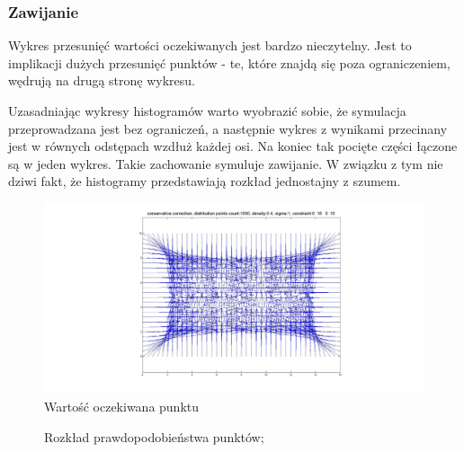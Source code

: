 \documentclass{mini}
\begin{document}
\subsubsection*{Zawijanie}
Wykres przesunięć wartości oczekiwanych jest bardzo nieczytelny. Jest to implikacji dużych przesunięć punktów - te, które znajdą się poza ograniczeniem, wędrują na drugą stronę wykresu.

Uzasadniając wykresy histogramów warto wyobrazić sobie, że symulacja przeprowadzana jest bez ograniczeń, a następnie wykres z wynikami przecinany jest w równych odstępach wzdłuż każdej osi. Na koniec tak pocięte części łączone są w jeden wykres. Takie zachowanie symuluje zawijanie. W związku z tym nie dziwi fakt, że histogramy przedstawiają rozkład jednostajny z szumem.

\begin{figure}[H]
\centering
\includegraphics[width=\textwidth]{wrapping2dprzesuniecie}
\caption{Wartość oczekiwana punktu}
\end{figure}

\begin{figure}[H]
\centering
{}
\quad
{}
\caption{Rozkład prawdopodobieństwa punktów;}
\end{figure}
\end{document}
